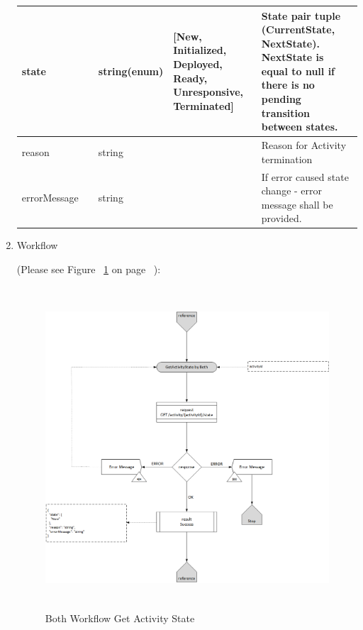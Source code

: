 \begin{enumerate}
\begin{table}[H]
\begin{center}
\begin{tabular}{|p{3cm}|l|p{3cm}|p{3cm}|p{4cm}|}
state				&	&	string(enum)		& [New, Initialized, Deployed, Ready, Unresponsive, Terminated]	&	State pair tuple (CurrentState, NextState). 
																													NextState is equal to null if there is no pending transition between states.\\
\hline  

reason 				&	&	string		&		& Reason for Activity termination \\
\hline

errorMessage		&	&	string		&		& If error caused state change - error message shall be provided. \\
\hline
 
\end{tabular}
\end{center}
\end{table}

\item Workflow

(Please see Figure ~\ref{fig:BGS} on page ~\pageref{fig:BGS}):

\begin{figure}[H]
    \centering
    \includegraphics[width=12cm,height=12cm,angle=0]{./diag/Workflow/Activity/GetActivityState-B-Workflow.png}
    \caption{Both Workflow Get Activity State }
	\label{fig:BGS}
\end{figure}


\end{enumerate}

